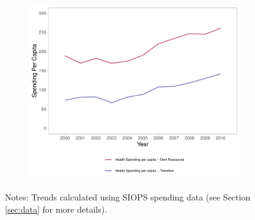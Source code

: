 \begin{figure}[h!]
\begin{center}
\begin{subfigure}{0.45\textwidth}
        \centering
        \includegraphics[width=\textwidth]{plots/plot_siops_level_source_top.pdf}
    \end{subfigure}
    \end{center}\vspace{+1pt}
    \scriptsize{Notes: Trends calculated using SIOPS spending data (see Section \ref{sec:data} for more details).}
\end{figure}